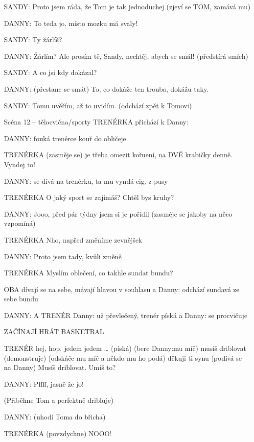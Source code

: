 \rep SANDY:        Proto jsem ráda, že Tom je tak jednoduchej (zjeví se TOM, zamává  mu) 

\rep DANNY:         To teda jo, místo mozku má svaly! 

\rep SANDY:         Ty žárlíš? 

\rep DANNY:        Žárlím? Ale prosím tě, Sandy, nechtěj, abych se smál! (předstírá smích) 

\rep SANDY:         A co jsi kdy dokázal? 

\rep DANNY:         (přestane se smát) To, co dokáže ten trouba, dokážu taky. 

\rep SANDY:        Tomu uvěřím, až to uvidím. (odchází zpět k Tomovi) 

Scéna 12 – tělocvična/sporty TRENÉRKA        přichází k \rep Danny: 

\rep DANNY:        fouká trenérce kouř do obličeje

TRENÉRKA        (zasměje se) je třeba omezit kořuení, na DVĚ krabičky denně. Vyndej to!

\rep DANNY:        se dívá na trenérku, ta mu vyndá cig. z pusy 

TRENÉRKA        O jaký sport se zajímáš? Chtěl bys kruhy?

\rep DANNY:        Jooo, před pár týdny jsem si je pořídil (zasměje se jakoby na něco                 vzpomíná)

TRENÉRKA        Nho, napřed změníme zevnějšek

\rep DANNY:        Proto jsem tady, kvůli změně 

TRENÉRKA        Myslím oblečení, co takhle sundat bundu?  

OBA        dívají se na sebe, mávají hlavou v souhlasu a \rep Danny: odchází sundavá        ze sebe bundu

\rep DANNY: A TRENÉR         \rep Danny: už převlečený, trenér píská a \rep Danny: se procvičuje

ZAČÍNAJÍ HRÁT BASKETBAL

TRENÉR        hej, hop, jedem jedem … (píská) (bere \rep Danny:mu míč) musíš driblovat         (demonstruje) (odskáče mu míč a někdo mu ho podá) děkuji ti synu                 (podívá se na Danny) Musíš driblovat. Umíš to?

\rep DANNY:        Pffff, jasně že jo!

(Přiběhne Tom a perfektně dribluje)

\rep DANNY:         (uhodí Toma do břicha)

TRENÉRKA        (povzdychne) NOOO!

